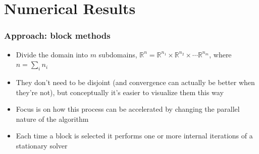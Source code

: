 \documentclass{beamer}
\begin{document}
\section{Numerical Results}

\begin{frame}
	\frametitle{Approach: block methods}
	\begin{itemize}
		\item Divide the domain into $m$ subdomains, $\mathbb{R}^n = \mathbb{R}^{n_1} \times \mathbb{R}^{n_2} \times \cdots \mathbb{R}^{n_m}$, where $n = \sum_i n_i$
		\item They don't need to be disjoint (and convergence can actually be better when they're not), but conceptually it's easier to visualize them this way
		\item Focus is on how this process can be accelerated by changing the parallel nature of the algorithm
		\item Each time a block is selected it performs one or more internal iterations of a stationary solver
	\end{itemize}
\end{frame}
\end{document}
